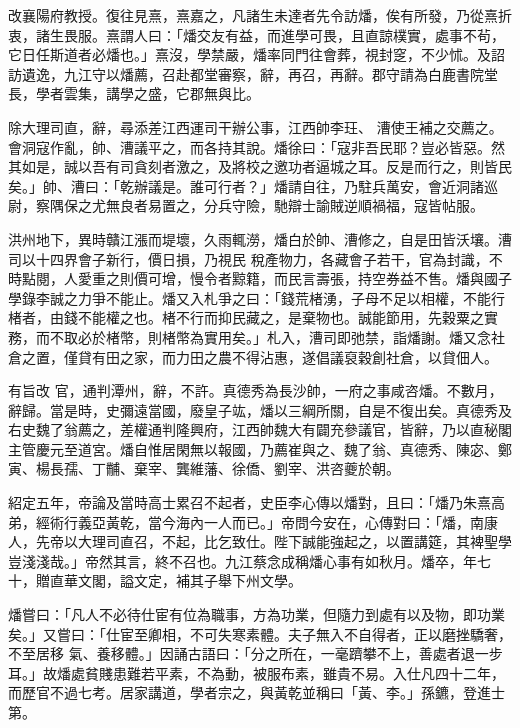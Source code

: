\begin{pinyinscope}
 改襄陽府教授。復往見熹，熹嘉之，凡諸生未達者先令訪燔，俟有所發，乃從熹折衷，諸生畏服。熹謂人曰：「燔交友有益，而進學可畏，且直諒樸實，處事不茍，它日任斯道者必燔也。」熹沒，學禁嚴，燔率同門往會葬，視封窆，不少怵。及詔訪遺逸，九江守以燔薦，召赴都堂審察，辭，再召，再辭。郡守請為白鹿書院堂長，學者雲集，講學之盛，它郡無與比。



 除大理司直，辭，尋添差江西運司干辦公事，江西帥李玨、
 漕使王補之交薦之。會洞寇作亂，帥、漕議平之，而各持其說。燔徐曰：「寇非吾民耶？豈必皆惡。然其如是，誠以吾有司貪刻者激之，及將校之邀功者逼城之耳。反是而行之，則皆民矣。」帥、漕曰：「乾辦議是。誰可行者？」燔請自往，乃駐兵萬安，會近洞諸巡尉，察隅保之尤無良者易置之，分兵守險，馳辯士諭賊逆順禍福，寇皆帖服。



 洪州地下，異時贛江漲而堤壞，久雨輒澇，燔白於帥、漕修之，自是田皆沃壤。漕司以十四界會子新行，價日損，乃視民
 稅產物力，各藏會子若干，官為封識，不時點閱，人愛重之則價可增，慢令者黥籍，而民言壽張，持空券益不售。燔與國子學錄李誠之力爭不能止。燔又入札爭之曰：「錢荒楮湧，子母不足以相權，不能行楮者，由錢不能權之也。楮不行而抑民藏之，是棄物也。誠能節用，先穀粟之實務，而不取必於楮幣，則楮幣為實用矣。」札入，漕司即弛禁，詣燔謝。燔又念社倉之置，僅貸有田之家，而力田之農不得沾惠，遂倡議裒穀創社倉，以貸佃人。



 有旨改
 官，通判潭州，辭，不許。真德秀為長沙帥，一府之事咸咨燔。不數月，辭歸。當是時，史彌遠當國，廢皇子竑，燔以三綱所關，自是不復出矣。真德秀及右史魏了翁薦之，差權通判隆興府，江西帥魏大有闢充參議官，皆辭，乃以直秘閣主管慶元至道宮。燔自惟居閑無以報國，乃薦崔與之、魏了翁、真德秀、陳宓、鄭寅、楊長孺、丁黼、棄宰、龔維藩、徐僑、劉宰、洪咨夔於朝。



 紹定五年，帝論及當時高士累召不起者，史臣李心傳以燔對，且曰：「燔乃朱熹高
 弟，經術行義亞黃乾，當今海內一人而已。」帝問今安在，心傳對曰：「燔，南康人，先帝以大理司直召，不起，比乞致仕。陛下誠能強起之，以置講筵，其裨聖學豈淺淺哉。」帝然其言，終不召也。九江蔡念成稱燔心事有如秋月。燔卒，年七十，贈直華文閣，謚文定，補其子舉下州文學。



 燔嘗曰：「凡人不必待仕宦有位為職事，方為功業，但隨力到處有以及物，即功業矣。」又嘗曰：「仕宦至卿相，不可失寒素體。夫子無入不自得者，正以磨挫驕奢，不至居移
 氣、養移體。」因誦古語曰：「分之所在，一毫躋攀不上，善處者退一步耳。」故燔處貧賤患難若平素，不為動，被服布素，雖貴不易。入仕凡四十二年，而歷官不過七考。居家講道，學者宗之，與黃乾並稱曰「黃、李。」孫鑣，登進士第。




\end{pinyinscope}
